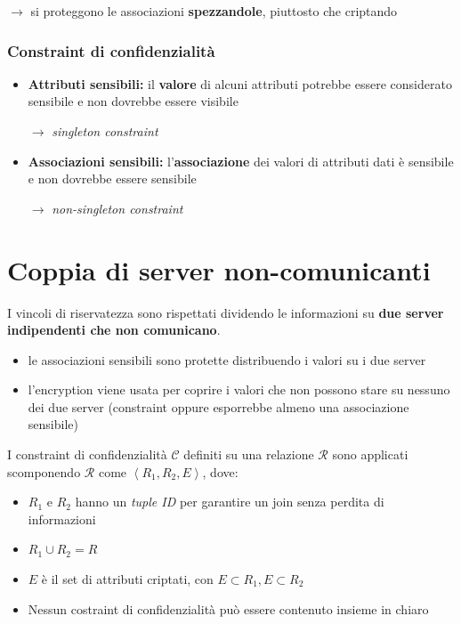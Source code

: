 \documentclass{report}
\begin{document}
$\rightarrow$ si proteggono le associazioni \textbf{spezzandole}, piuttosto che criptando

\subsubsection{Constraint di confidenzialità}
\begin{itemize}
    \item \textbf{Attributi sensibili:} il \textbf{valore} di alcuni attributi potrebbe essere considerato sensibile e non dovrebbe essere visibile 
    
    $\rightarrow$ \textit{singleton constraint}
    \item \textbf{Associazioni sensibili:} l'\textbf{associazione} dei valori di attributi dati è sensibile e non dovrebbe essere sensibile 
    
    $\rightarrow$ \textit{non-singleton constraint}
\end{itemize}

\section{Coppia di server non-comunicanti}
I vincoli di riservatezza sono rispettati dividendo le informazioni
su \textbf{due server indipendenti che non comunicano}.
\begin{itemize}
    \item le associazioni sensibili sono protette distribuendo i valori su 
    i due server 
    \item l'encryption viene usata per coprire i valori che non possono stare su nessuno dei due server (constraint oppure 
    esporrebbe almeno una associazione sensibile)
\end{itemize}

I constraint di confidenzialità $\mathcal{C}$ definiti su una relazione 
$\mathcal{R}$ sono applicati scomponendo $\mathcal{R}$ come $\left\langle R_1, R_2, E \right\rangle$, dove:
\begin{itemize}
    \item $R_1$ e $R_2$ hanno un \textit{tuple ID} per garantire un join senza perdita di informazioni
    \item $R_1 \cup R_2 = R $
    \item $E$ è il set di attributi criptati, con $E \subset R_1, E \subset R_2$
    \item Nessun costraint di confidenzialità può essere contenuto insieme in chiaro  
\end{itemize}
\end{document}
